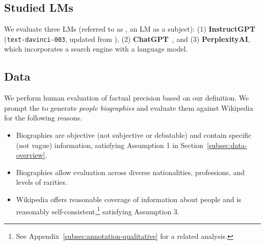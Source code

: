 \subsection{Studied LMs}
We evaluate three LMs (referred to as \subjectLM{}, %
an LM as a subject):
(1) \textbf{InstructGPT} (\texttt{text-davinci-003}, updated from \citet{ouyang2022training}),
(2) \textbf{ChatGPT}~\citep{chatgpt}, %
and (3) \textbf{PerplexityAI}, which incorporates a search engine with a language model. %

\subsection{Data}
\label{subsec:data}


We perform human evaluation of factual precision based on our definition. We prompt the \subjectLM{} to generate {\em people biographies} and evaluate them against Wikipedia for the following reasons.
\vspace{-.3em}
\begin{itemize}[leftmargin=15pt]\itemsep -.2em
    \item Biographies are objective (not subjective or debatable) and contain specific (not vague) information, satisfying Assumption 1 in Section~\ref{subsec:data-overview}. %
    \item Biographies allow evaluation across diverse nationalities, professions, and levels of rarities.
    \item Wikipedia offers reasonable coverage of information about people and is reasonably self-consistent,\footnote{See Appendix~\ref{subsec:annotation-qualitative} for a related analysis.} satisfying Assumption 3. %
\end{itemize}


